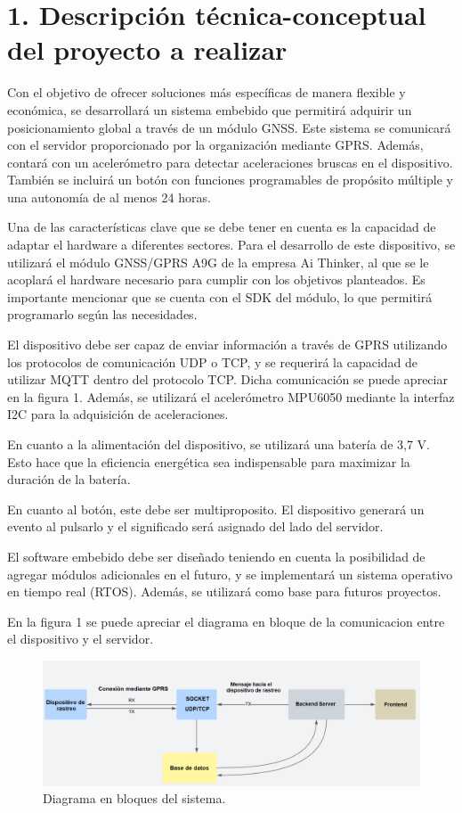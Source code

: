 \documentclass[
11pt, %
codirector, %
]{charter}
\begin{document}
\section{1. Descripción técnica-conceptual del proyecto a realizar}
\label{sec:descripcion}


Con el objetivo de ofrecer soluciones más específicas de manera flexible y económica, se desarrollará un sistema embebido que permitirá adquirir un posicionamiento global a través de un módulo GNSS. Este sistema se comunicará con el servidor proporcionado por la organización mediante GPRS. Además, contará con un acelerómetro para detectar aceleraciones bruscas en el dispositivo. También se incluirá un botón con funciones programables de propósito múltiple y una autonomía de al menos 24 horas.

Una de las características clave que se debe tener en cuenta es la capacidad de adaptar el hardware a diferentes sectores. Para el desarrollo de este dispositivo, se utilizará el módulo GNSS/GPRS A9G de la empresa Ai Thinker, al que se le acoplará el hardware necesario para cumplir con los objetivos planteados. Es importante mencionar que se cuenta con el SDK del módulo, lo que permitirá programarlo según las necesidades.

El dispositivo debe ser capaz de enviar información a través de GPRS utilizando los protocolos de comunicación UDP o TCP, y se requerirá la capacidad de utilizar MQTT dentro del protocolo TCP. Dicha comunicación se puede apreciar en la figura 1. Además, se utilizará el acelerómetro MPU6050 mediante la interfaz I2C para la adquisición de aceleraciones.

En cuanto a la alimentación del dispositivo, se utilizará una batería de 3,7 V. Esto hace que la eficiencia energética sea indispensable para maximizar la duración de la batería.

En cuanto al botón, este debe ser multiproposito. El dispositivo generará un evento al pulsarlo y el significado será asignado del lado del servidor.

El software embebido debe ser diseñado teniendo en cuenta la posibilidad de agregar módulos adicionales en el futuro, y se implementará un sistema operativo en tiempo real (RTOS). Además, se utilizará como base para futuros proyectos.

En la figura 1 se puede apreciar el diagrama en bloque de la comunicacion entre el dispositivo y el servidor.


\begin{figure}[htpb]
\centering 
\includegraphics[width=1\textwidth]{./Figuras/diagBloque.png}
\caption{Diagrama en bloques del sistema.}
\label{fig:diagBloques}
\end{figure}
\end{document}
